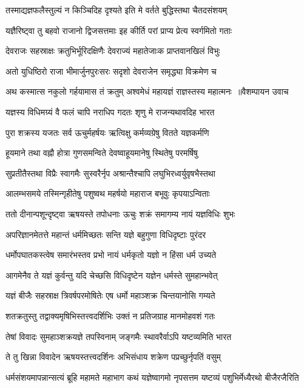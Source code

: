 \twolineshloka
{तस्माद्यज्ञफलैस्तुल्यं न किञ्चिदिह दृश्यते}
{इति मे वर्तते बुद्धिस्तथा चैतदसंशयम्}


\twolineshloka
{यज्ञैरिष्ट्वा तु बहवो राजानो द्विजसत्तमाः}
{इह कीर्ति परां प्राप्य प्रेत्य स्वर्गमितो गताः}


\twolineshloka
{देवराजः सहस्राक्षः क्रतुभिर्भूरिदक्षिणैः}
{देवराज्यं महातेजाःक प्राप्तवानखिलं विभुः}


\twolineshloka
{अतो युधिष्ठिरो राजा भीमार्जुनपुरःसरः}
{सदृशो देवराजेन समृद्ध्या विक्रमेण च}


\threelineshloka
{अथ कस्मात्स नकुलो गर्हयामास तं क्रतुम्}
{अश्वमेधं महायज्ञं राज्ञस्तस्य महात्मनः ॥वैशम्पायन उवाच}
{}


\twolineshloka
{यज्ञस्य विधिमग्र्यं वै फलं चापि नराधिप}
{गदतः शृणु मे राजन्यथावदिह भारत}


\twolineshloka
{पुरा शक्रस्य यजतः सर्व ऊचुर्महर्षयः}
{ऋत्विक्षु कर्मव्यग्रेषु वितते यज्ञकर्मणि}


\twolineshloka
{हूयमाने तथा वह्नौ होत्रा गुणसमन्विते}
{देवष्वाहूयमानेषु स्थितेषु परमर्षिषु}


\twolineshloka
{सुप्रतीतैस्तथा विप्रैः स्वागमैः सुस्वरैर्नृप}
{अश्रान्तैश्चापि लघुभिरध्वर्युवृषभैस्तथा}


\twolineshloka
{आलम्भसमये तस्मिन्गृहीतेषु पशुष्वथ}
{महर्षयो महाराज बभूवुः कृपयाऽन्विताः}


\twolineshloka
{ततो दीनान्पशून्दृष्ट्वा ऋषयस्ते तपोधनाः}
{ऊचुः शक्रं समागम्य नायं यज्ञविधिः शुभः}


\twolineshloka
{अपरिज्ञानमेतत्ते महान्तं धर्ममिच्छतः}
{सन्ति यज्ञे बहुगुणा विधिदृष्टाः पुरंदर}


\twolineshloka
{धर्मोपघातकस्त्वेष समारंभस्तव प्रभो}
{नायं धर्मकृतो यज्ञो न हिंसा धर्म उच्यते}


\twolineshloka
{आगमेनैव ते यज्ञं कुर्वन्तु यदि चेच्छसि}
{विधिदृष्टेन यज्ञेन धर्मस्ते सुमहान्भवेत्}


\twolineshloka
{यज्ञं बीजैः सहस्राक्ष त्रिवर्षपरमोषितेः}
{एष धर्मो महाञ्शक्र चिन्तयानोसि गम्यते}


\twolineshloka
{शतक्रतुस्तु तद्वाक्यमृषिभिस्तत्त्वदर्शिभिः}
{उक्तं न प्रतिजग्राह मानमोहवशं गतः}


\twolineshloka
{तेषां विवादः सुमहाञ्शक्रयज्ञे तपस्विनाम्}
{जङ्गमैः स्थावरैर्वाऽपि यष्टव्यमिति भारत}


\twolineshloka
{ते तु खिन्ना विवादेन ऋषयस्तत्त्वदर्शिनः}
{अभिसंधाय शक्रेण पप्रच्छुर्नृपतिं वसुम्}


\threelineshloka
{धर्मसंशयमापन्नान्सत्यं ब्रूहि महामते}
{महाभाग कथं यज्ञेष्वागमो नृपसत्तम}
{यष्टव्यं पशुभिर्मेध्यैरथो बीजैरजैरिति}



